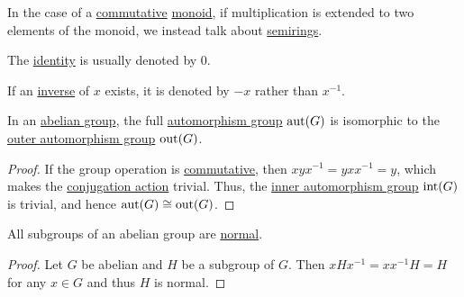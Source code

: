 \begin{remark}
\begin{thmenum}
    In the case of a \hyperref[def:magma/commutative]{commutative} \hyperref[def:monoid]{monoid}, if multiplication is extended to two elements of the monoid, we instead talk about \hyperref[def:semiring]{semirings}.

     The \hyperref[def:monoid]{identity} is usually denoted by \( 0 \).

     If an \hyperref[def:monoid_inverse]{inverse} of \( x \) exists, it is denoted by \( -x \) rather than \( x^{-1} \).
  \end{thmenum}
\end{remark}

\begin{proposition}\label{thm:abelian_outer_automorphism_group}
  In an \hyperref[def:abelian_group]{abelian group}, the full \hyperref[def:automorphism_group]{automorphism group} \( \operatorname{aut}(G) \) is isomorphic to the \hyperref[def:inner_and_outer_automorphisms]{outer automorphism group} \( \operatorname{out}(G) \).
\end{proposition}
\begin{proof}
  If the group operation is \hyperref[def:magma/commutative]{commutative}, then \( xyx^{-1} = yxx^{-1} = y \), which makes the \hyperref[def:inner_and_outer_automorphisms]{conjugation action} trivial. Thus, the \hyperref[def:inner_and_outer_automorphisms]{inner automorphism group} \( \operatorname{int}(G) \) is trivial, and hence \( \operatorname{aut}(G) \cong \operatorname{out}(G) \).
\end{proof}

\begin{proposition}\label{thm:abelian_normal_subgroups}
  All subgroups of an abelian group are \hyperref[def:normal_subgroup]{normal}.
\end{proposition}
\begin{proof}
  Let \( G \) be abelian and \( H \) be a subgroup of \( G \). Then \( x H x^{-1} = xx^{-1} H = H \) for any \( x \in G \) and thus \( H \) is normal.
\end{proof}

